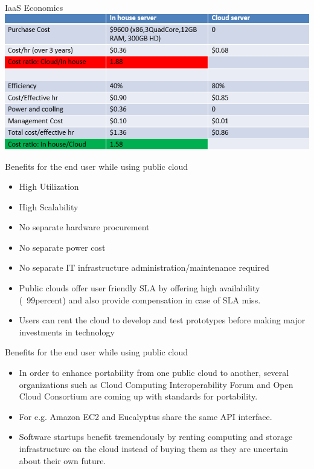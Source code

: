 \documentclass{SKP-beamer}
\begin{document}
\begin{frame}{IaaS Economics}
	\includegraphics[scale=0.8]{a.png}
\end{frame}


\begin{frame}{Benefits for the end user while using public cloud}
	\begin{itemize}
		\item High Utilization
		
		\item High Scalability
		\item No separate hardware procurement
		\item No separate power cost
		\item No separate IT infrastructure administration/maintenance required
		\item Public clouds offer user friendly SLA by offering high availability (~99percent) and also provide compensation in case of SLA miss. 
		\item Users can rent the cloud to develop and test prototypes before making major
		investments in technology
		
	\end{itemize}
\end{frame}

\begin{frame}{Benefits for the end user while using public cloud}
	\begin{itemize}
		\item In order to enhance portability from one public cloud to another, several organizations such as Cloud Computing Interoperability Forum and Open Cloud Consortium are coming up with standards for portability.
		\item For e.g. Amazon EC2 and Eucalyptus share the same API interface.
		\item Software startups benefit tremendously by renting computing and storage infrastructure on the cloud instead of buying them as they are uncertain about their own future.	
	\end{itemize}
\end{frame}
\end{document}
